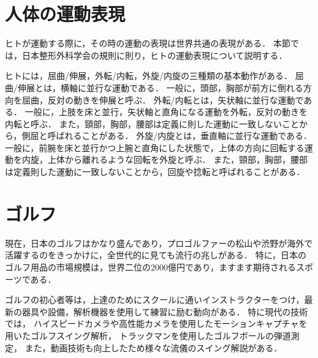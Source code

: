 
\section{人体の運動表現}
ヒトが運動する際に，その時の運動の表現は世界共通の表現がある．
本節では，日本整形外科学会の規則に則り，ヒトの運動表現について説明する．

ヒトには，屈曲/伸展，外転/内転，外旋/内旋の三種類の基本動作がある．
屈曲/伸展とは，横軸に並行な運動である．
一般に，頭部，胸部が前方に倒れる方向を屈曲，反対の動きを伸展と呼ぶ．
外転/内転とは，矢状軸に並行な運動である．
一般に，上肢を床と並行，矢状軸と直角になる運動を外転，反対の動きを内転と呼ぶ．
また，頸部，胸部，腰部は定義に則した運動に一致しないことから，側屈と呼ばれることがある．
外旋/内旋とは，垂直軸に並行な運動である．
一般に，前腕を床と並行かつ上腕と直角にした状態で，上体の方向に回転する運動を内旋，上体から離れるような回転を外旋と呼ぶ．
また，頸部，胸部，腰部は定義則した運動に一致しないことから，回旋や捻転と呼ばれることがある．

\section{ゴルフ}
%
現在，日本のゴルフはかなり盛んであり，プロゴルファーの松山や渋野が海外で活躍するのをきっかけに，全世代的に見ても流行の兆しがある．
特に，日本のゴルフ用品の市場規模は，世界二位の2000億円であり，ますます期待されるスポーツである．

ゴルフの初心者等は，上達のためにスクールに通いインストラクターをつけ，最新の器具や設備，解析機器を使用して練習に励む動向がある．
特に現代の技術では，
ハイスピードカメラや高性能カメラを使用したモーションキャプチャを用いたゴルフスイング解析，
トラックマンを使用したゴルフボールの弾道測定，
また，動画技術も向上したため様々な流儀のスイング解説がある．

